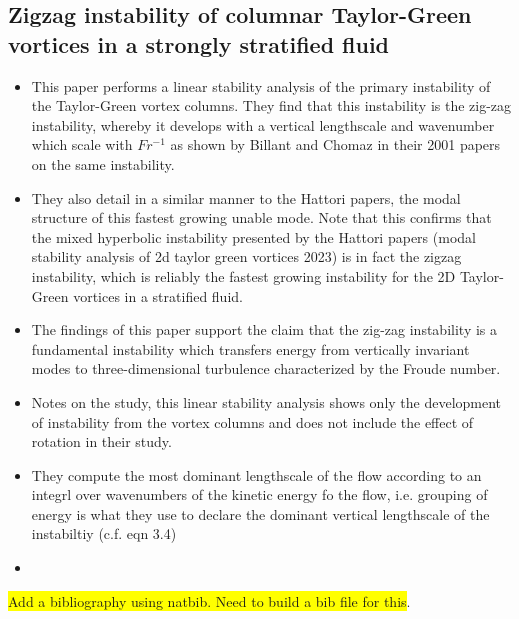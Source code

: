 \documentclass{article}
\begin{document}
    \subsection{Zigzag instability of columnar Taylor-Green vortices in a
    strongly stratified fluid}
    \begin{itemize}
        \item This paper performs a linear stability analysis of the primary
        instability of the Taylor-Green vortex columns. They find that this
        instability is the zig-zag instability, whereby it develops with a
        vertical lengthscale and wavenumber which scale with $Fr^{-1}$ as shown
        by Billant and Chomaz in their 2001 papers on the same instability. 
        \item They also detail in a similar manner to the Hattori papers, the
        modal structure of this fastest growing unable mode. Note that this
        confirms that the mixed hyperbolic instability presented by the Hattori
        papers (modal stability analysis of 2d taylor green vortices 2023) is in
        fact the zigzag instability, which is reliably the fastest growing
        instability for the 2D Taylor-Green vortices in a stratified fluid. 
        \item The findings of this paper support the claim that the zig-zag
        instability is a fundamental instability which transfers energy from
        vertically invariant modes to three-dimensional turbulence characterized
        by the Froude number. 
        \item Notes on the study, this linear stability analysis shows only the
        development of instability from the vortex columns and does not include
        the effect of rotation in their study. 
        \item They compute the most dominant lengthscale of the flow according
        to an integrl over wavenumbers of the kinetic energy fo the flow, i.e.
        grouping of energy is what they use to declare the dominant vertical
        lengthscale of the instabiltiy (c.f. eqn 3.4)
        \item 
    \end{itemize}

\colorbox{yellow}{Add a bibliography using natbib. Need to build a bib file for this}. 
\end{document}
